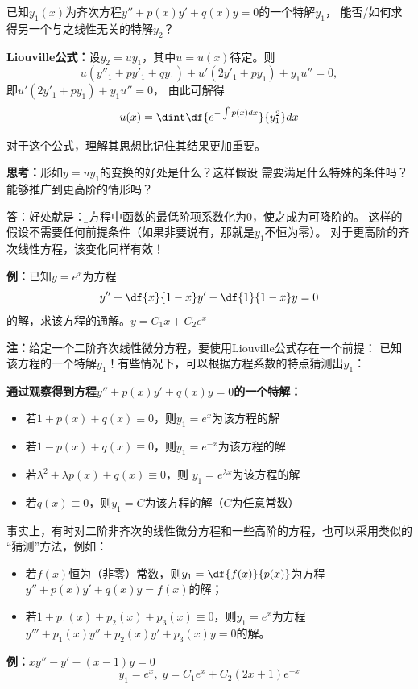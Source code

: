 已知$y_1(x)$为齐次方程$y''+p(x)y'+q(x)y=0$的一个特解$y_1$，
能否/如何求得另一个与之线性无关的特解$y_2$？

\begin{thx}
	{\bf Liouville公式：}设$y_2=uy_1$，其中$u=u(x)$待定。则
	$$u{(y''_1+py'_1+qy_1)}+u'(2y'_1+py_1)+y_1u''=0,$$ 
	即$u'(2y'_1+py_1)+y_1u''=0$， 由此可解得
	$${u(x)=\dint\df{e^{-\int p(x)dx}}{y_1^2}dx}$$	
\end{thx}

对于这个公式，理解其思想比记住其结果更加重要。

{\bf 思考：}形如$y=uy_1$的变换的好处是什么？这样假设
需要满足什么特殊的条件吗？能够推广到更高阶的情形吗？

答：好处就是：{\b 将方程中函数的最低阶项系数化为$0$，使之成为可降阶的}。
这样的假设不需要任何前提条件（如果非要说有，那就是$y_1$不恒为零）。
对于更高阶的齐次线性方程，该变化同样有效！

{\bf 例：}已知$y=e^x$为方程
$$y''+\df{x}{1-x}y'-\df{1}{1-x}y=0$$
的解，求该方程的通解。\hfill $y=C_1x+C_2e^x$

{\bf 注：}给定一个二阶齐次线性微分方程，要使用Liouville公式存在一个前提：
已知该方程的一个特解$y_1$！有些情况下，可以根据方程系数的特点猜测出$y_1$：

\begin{thx}
	{\bf 通过观察得到方程$y''+p(x)y'+q(x)y=0$的一个特解：}
	
	\begin{itemize}
	  \item 若$1+p(x)+q(x)\equiv0$，则$y_1=e^x$为该方程的解
	  \item 若$1-p(x)+q(x)\equiv0$，则$y_1=e^{-x}$为该方程的解
	  \item 若$\lambda^2+\lambda p(x)+q(x)\equiv0$，则
	  $y_1=e^{\lambda x}$为该方程的解
	  \item 若$q(x)\equiv0$，则$y_1=C$为该方程的解（$C$为任意常数）
	\end{itemize}
\end{thx}

事实上，有时对二阶非齐次的线性微分方程和一些高阶的方程，也可以采用类似的
“猜测”方法，例如：
\begin{itemize}
  \item 若$f(x)$恒为（非零）常数，则$y_1=\df{f(x)}{p(x)}$为方程
  $y''+p(x)y'+q(x)y=f(x)$的解；
  \item 若$1+p_1(x)+p_2(x)+p_3(x)\equiv0$，则$y_1=e^x$为方程
  $y'''+p_1(x)y''+p_2(x)y'+p_3(x)y=0$的解。
\end{itemize}

{\bf 例：}$xy''-y'-(x-1)y=0$
$$y_1=e^x,\;y=C_1e^x+C_2(2x+1)e^{-x}$$

